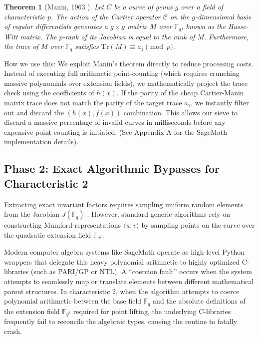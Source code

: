\documentclass[letterpaper, 11pt]{article}
\newtheorem{theorem}{Theorem}[section]
\begin{document}
\begin{theorem}[Manin, 1963 \cite{Manin1963}]
Let $C$ be a curve of genus $g$ over a field of characteristic $p$. The action of the Cartier operator $\mathcal{C}$ on the $g$-dimensional basis of regular differentials generates a $g \times g$ matrix $M$ over $\mathbb{F}_q$, known as the Hasse-Witt matrix. The $p$-rank of its Jacobian is equal to the rank of $M$. Furthermore, the trace of $M$ over $\mathbb{F}_q$ satisfies $\text{Tr}(M) \equiv a_1 \pmod p$.
\end{theorem}

How we use this: We exploit Manin's theorem directly to reduce processing costs. Instead of executing full arithmetic point-counting (which requires crunching massive polynomials over extension fields), we mathematically project the trace check using the coefficients of $h(x)$. If the parity of the cheap Cartier-Manin matrix trace does not match the parity of the target trace $a_1$, we instantly filter out and discard the $(h(x), f(x))$ combination. This allows our sieve to discard a massive percentage of invalid curves in milliseconds before any expensive point-counting is initiated. (See Appendix A for the SageMath implementation details).

\subsection{Phase 2: Exact Algorithmic Bypasses for Characteristic 2}
Extracting exact invariant factors requires sampling uniform random elements from the Jacobian $J(\mathbb{F}_q)$ \cite{Sutherland2007}. However, standard generic algorithms rely on constructing Mumford representations $\langle u, v \rangle$ \cite{Cantor1987} by sampling points on the curve over the quadratic extension field $\mathbb{F}_{q^2}$. 

Modern computer algebra systems like SageMath operate as high-level Python wrappers that delegate this heavy polynomial arithmetic to highly optimized C-libraries (such as PARI/GP or NTL). A ``coercion fault'' occurs when the system attempts to seamlessly map or translate elements between different mathematical parent structures. In characteristic 2, when the algorithm attempts to coerce polynomial arithmetic between the base field $\mathbb{F}_{q}$ and the absolute definitions of the extension field $\mathbb{F}_{q^2}$ required for point lifting, the underlying C-libraries frequently fail to reconcile the algebraic types, causing the routine to fatally crash.
\end{document}
